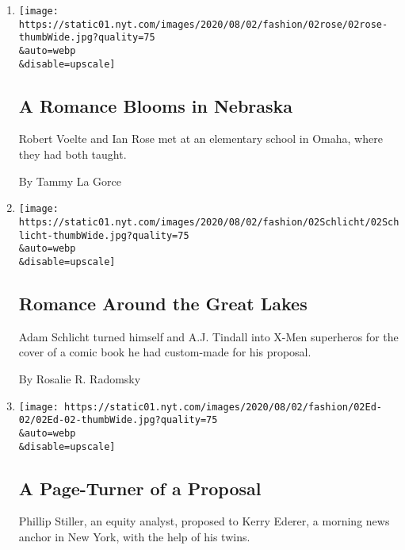\begin{enumerate}
\def\labelenumi{\arabic{enumi}.}
\item
  \href{/2020/07/31/fashion/weddings/a-romance-blooms-in-nebraska.html}{}

  \texttt{[image: https://static01.nyt.com/images/2020/08/02/fashion/02rose/02rose-thumbWide.jpg?quality=75\\\&auto=webp\\\&disable=upscale]}

  \hypertarget{a-romance-blooms-in-nebraska}{%
  \subsection{A Romance Blooms in
  Nebraska}\label{a-romance-blooms-in-nebraska}}

  Robert Voelte and Ian Rose met at an elementary school in Omaha, where
  they had both taught.

  By Tammy La Gorce
\item
  \href{/2020/07/31/fashion/weddings/romance-around-the-great-lakes.html}{}

  \texttt{[image: https://static01.nyt.com/images/2020/08/02/fashion/02Schlicht/02Schlicht-thumbWide.jpg?quality=75\\\&auto=webp\\\&disable=upscale]}

  \hypertarget{romance-around-the-great-lakes}{%
  \subsection{Romance Around the Great
  Lakes}\label{romance-around-the-great-lakes}}

  Adam Schlicht turned himself and A.J. Tindall into X-Men superheros
  for the cover of a comic book he had custom-made for his proposal.

  By Rosalie R. Radomsky
\item
  \href{/2020/07/31/fashion/weddings/a-page-turner-of-a-proposal.html}{}

  \texttt{[image: https://static01.nyt.com/images/2020/08/02/fashion/02Ed-02/02Ed-02-thumbWide.jpg?quality=75\\\&auto=webp\\\&disable=upscale]}

  \hypertarget{a-page-turner-of-a-proposal}{%
  \subsection{A Page-Turner of a
  Proposal}\label{a-page-turner-of-a-proposal}}

  Phillip Stiller, an equity analyst, proposed to Kerry Ederer, a
  morning news anchor in New York, with the help of his twins.


\end{enumerate}
